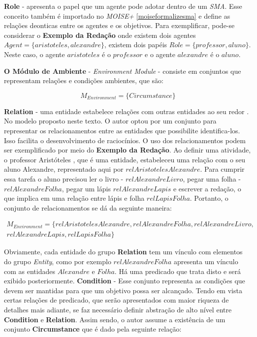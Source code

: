 \textbf{Role} - apresenta o papel que um agente pode adotar dentro de um \textit{SMA}. Esse conceito também é importado no \textit{MOISE+} 
\ref{moiseformalizesma} e define as relações deonticas entre os agentes e os objetivos. Para exemplificar, pode-se considerar o \textbf{Exemplo da Redação} onde existem dois agentes $Agent = \{ aristoteles, alexandre \}$, existem dois papéis $Role = \{ professor, aluno\}$. Neste caso, o agente $aristoteles$ é o $professor$ e o agente $alexandre$ é o $aluno$.

\textbf{O Módulo de Ambiente} - \textit{Environment Module} - consiste em conjuntos que representam relações e condições ambientes, que são:

\begin{equation}
    M_{Environment} = \{  Circumstance  \}
\end{equation}

\textbf{Relation} - uma entidade estabelece relações com outras entidades ao seu redor \cite{entity}. No modelo proposto neste texto. O autor optou por um conjunto para representar os relacionamentos entre as entidades que possibilite identifica-los. Isso facilita o desenvolvimento de raciocínios. O uso 
dos relacionamentos podem ser exemplificado por meio do \textbf{Exemplo da Redação}. Ao definir uma atividade, o professor Aristóteles
, que é uma entidade, estabeleceu uma relação com o seu aluno Alexandre, representado aqui por $relAristotelesAlexandre$. Para cumprir essa tarefa o aluno precisou ler o livro - $relAlexandreLivro$, pegar uma folha - $relAlexandreFolha$,  pegar um lápis $relAlexandreLapis$ e escrever a redação, o que implica em uma relação entre lápis e folha $relLapisFolha$. Portanto, o conjunto de relacionamentos se dá da seguinte maneira:

\begin{eqnarray}\label{Environment}\nonumber
    M_{Environment} = \{ relAristotelesAlexandre, relAlexandreFolha, relAlexandreLivro, \\ \nonumber
     relAlexandreLapis, relLapisFolha \}
\end{eqnarray}

Obviamente, cada entidade do grupo \textbf{Relation} tem um vínculo com elementos do grupo \textit{Entity}, como por exemplo $relAlexandreFolha$ apresenta um vínculo com as entidades $Alexandre$ e $Folha$. Há uma predicado que trata disto e será exibido posteriormente. \textbf{Condition} - Esse conjunto representa as condições que devem ser mantidas para que um objetivo possa ser alcançado. Tendo em vista certas relações de predicado, que serão apresentados com maior riqueza de detalhes mais adiante, se faz necessário definir abstração de alto nível entre \textbf{Condition} e \textbf{Relation}. Assim sendo, o autor assume a existência de um conjunto \textbf{Circumstance} que é dado pela seguinte relação: 

